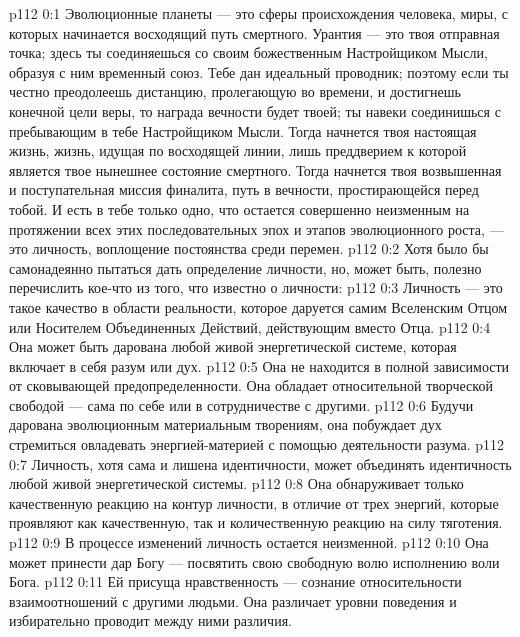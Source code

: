 \author{Одиночный Вестник}
\vs p112 0:1 Эволюционные планеты --- это сферы происхождения человека, миры, с которых начинается восходящий путь смертного. Урантия --- это твоя отправная точка; здесь ты соединяешься со своим божественным Настройщиком Мысли, образуя с ним временный союз. Тебе дан идеальный проводник; поэтому если ты честно преодолеешь дистанцию, пролегающую во времени, и достигнешь конечной цели веры, то награда вечности будет твоей; ты навеки соединишься с пребывающим в тебе Настройщиком Мысли. Тогда начнется твоя настоящая жизнь, жизнь, идущая по восходящей линии, лишь преддверием к которой является твое нынешнее состояние смертного. Тогда начнется твоя возвышенная и поступательная миссия финалита, путь в вечности, простирающейся перед тобой. И есть в тебе только одно, что остается совершенно неизменным на протяжении всех этих последовательных эпох и этапов эволюционного роста, --- это личность, воплощение постоянства среди перемен.
\vs p112 0:2 \pc Хотя было бы самонадеянно пытаться дать определение личности, но, может быть, полезно перечислить кое\hyp{}что из того, что известно о личности:
\vs p112 0:3 \bibnobreakspace Личность --- это такое качество в области реальности, которое даруется самим Вселенским Отцом или Носителем Объединенных Действий, действующим вместо Отца.
\vs p112 0:4 \pc {}\bibnobreakspace Она может быть дарована любой живой энергетической системе, которая включает в себя разум или дух.
\vs p112 0:5 \pc {}\bibnobreakspace Она не находится в полной зависимости от сковывающей предопределенности. Она обладает относительной творческой свободой --- сама по себе или в сотрудничестве с другими.
\vs p112 0:6 \pc {}\bibnobreakspace Будучи дарована эволюционным материальным творениям, она побуждает дух стремиться овладевать энергией\hyp{}материей с помощью деятельности разума.
\vs p112 0:7 \pc {}\bibnobreakspace Личность, хотя сама и лишена идентичности, может объединять идентичность любой живой энергетической системы.
\vs p112 0:8 \pc {}\bibnobreakspace Она обнаруживает только качественную реакцию на контур личности, в отличие от трех энергий, которые проявляют как качественную, так и количественную реакцию на силу тяготения.
\vs p112 0:9 \pc {}\bibnobreakspace В процессе изменений личность остается неизменной.
\vs p112 0:10 \pc {}\bibnobreakspace Она может принести дар Богу --- посвятить свою свободную волю исполнению воли Бога.
\vs p112 0:11 \pc {}\bibnobreakspace Ей присуща нравственность --- сознание относительности взаимоотношений с другими людьми. Она различает уровни поведения и избирательно проводит между ними различия.
